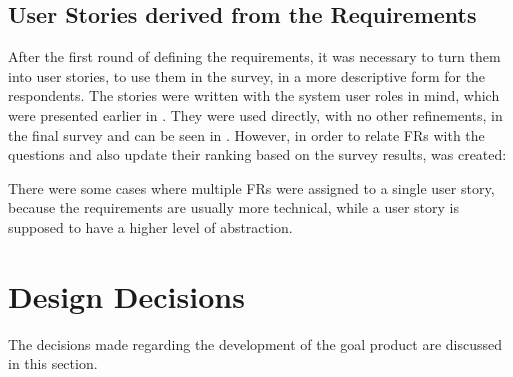 

\subsection{User Stories derived from the Requirements}\label{ext:user-stories}

After the first round of defining the requirements, it was necessary to turn them into user stories, to use them in the survey, in a more descriptive form for the respondents. The stories were written with the system user roles in mind, which were presented earlier in . They were used directly, with no other refinements, in the final survey and can be seen in . However, in order to relate \acp{FR} with the questions and also update their ranking based on the survey results,  was created:



There were some cases where multiple \acp{FR} were assigned to a single user story, because the requirements are usually more technical, while a user story is supposed to have a higher level of abstraction.


\section{Design Decisions}\label{ext:design-decisions}

The decisions made regarding the development of the goal product are discussed in this section.


